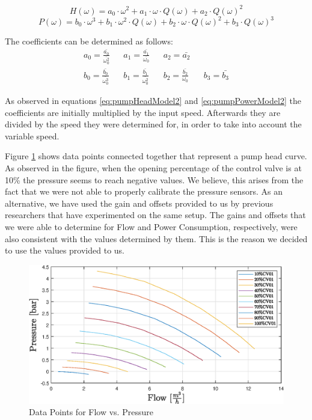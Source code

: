 \begin{equation}
	H(\omega) = a_0 \cdot \omega^2 + a_1 \cdot \omega \cdot Q(\omega) + a_2 \cdot Q(\omega)^2
	\label{eq:pumpHeadModel2}
\end{equation}
\begin{equation}
	P(\omega) = b_0 \cdot \omega^3 + b_1 \cdot \omega^2 \cdot Q(\omega) + b_2 \cdot \omega \cdot Q(\omega)^2 + b_3 \cdot Q(\omega)^3
	\label{eq:pumpPowerModel2}
\end{equation}

\newpage
The coefficients can be determined as follows:
\begin{align*}
	a_0 = \frac{\bar{a_0}}{\bar{\omega_0^2}} && a_1 = \frac{\bar{a_1}}{\bar{\omega_0}} && a_2 = \bar{a_2} \\
	b_0 = \frac{\bar{b_0}}{\bar{\omega_0^3}} && b_1 = \frac{\bar{b_1}}{\bar{\omega_0^2}} && b_2 = \frac{\bar{b_2}}{\omega_0} && b_3 = \bar{b_3}
\end{align*}

As observed in equations \ref{eq:pumpHeadModel2} and \ref{eq:pumpPowerModel2} the coefficients are
initially multiplied by the input speed. Afterwards they are divided by the
speed they were determined for, in order to take into account the variable speed.

Figure \ref{fig:flowVsPressure} shows data points connected together that represent 
a pump head curve. As observed in the figure, when the opening percentage of the control valve is at
10\% the pressure seems to reach negative values. We believe, this arises from the fact that we were not 
able to properly calibrate the pressure sensors. As an alternative, we have used the gain and offsets
provided to us by previous researchers that have experimented on the same setup.
The gains and offsets that we were able to determine for Flow and Power Consumption,
respectively, were also consistent with the values determined by them.
This is the reason we decided to use the values provided to us.

\begin{figure}[h]
	\centering
	\includegraphics[width=1\textwidth]{figures/05mathematicalModelling/flowVsPressureRun34.eps}
	\caption{Data Points for Flow vs. Pressure}
	\label{fig:flowVsPressure}
\end{figure}

